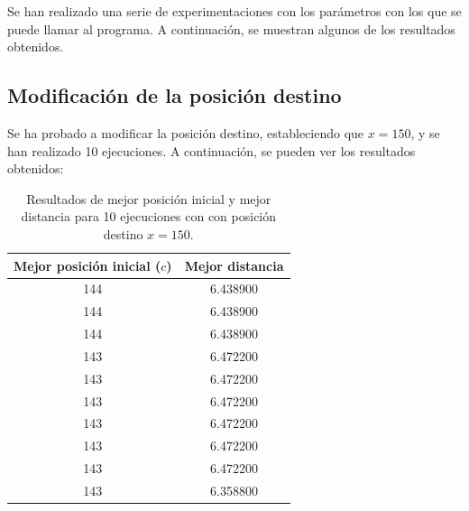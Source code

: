 \documentclass[11pt,a4paper]{report}
\begin{document}
Se han realizado una serie de experimentaciones con los parámetros con los que se puede llamar al programa.
A continuación, se muestran algunos de los resultados obtenidos.

\subsection{Modificación de la posición destino}

Se ha probado a modificar la posición destino, estableciendo que $x = 150$, y se han realizado 10 ejecuciones.
A continuación, se pueden ver los resultados obtenidos:

\begin{table}[H]
\centering
\begin{tabular}{c|c}
\textbf{Mejor posición inicial ($c$)} & \textbf{Mejor distancia} \\ \hline
144                              & 6.438900                 \\
144                              & 6.438900                 \\
144                              & 6.438900                 \\
143                              & 6.472200                 \\
143                              & 6.472200                 \\
143                              & 6.472200                 \\
143                              & 6.472200                 \\
143                              & 6.472200                 \\
143                              & 6.472200                 \\
143                              & 6.358800                
\end{tabular}
\caption{Resultados de mejor posición inicial y mejor distancia para 10 ejecuciones con
con posición destino $x = 150$.}
\label{aparc-150-tabla}
\end{table}
\end{document}
